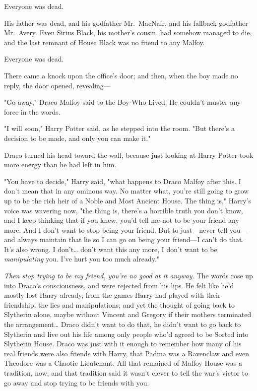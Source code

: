 Everyone was dead.

His father was dead, and his godfather Mr.~MacNair, and his fallback godfather
Mr.~Avery. Even Sirius Black, his mother's cousin, had somehow managed to die,
and the last remnant of House Black was no friend to any Malfoy.

Everyone was dead.

There came a knock upon the office's door; and then, when the boy made no
reply, the door opened, revealing---

"Go away," Draco Malfoy said to the Boy-Who-Lived. He couldn't muster any force
in the words.

"I will soon," Harry Potter said, as he stepped into the room. "But there's a
decision to be made, and only you can make it."

Draco turned his head toward the wall, because just looking at Harry Potter
took more energy than he had left in him.

"You have to decide," Harry said, "what happens to Draco Malfoy after this. I
don't mean that in any ominous way. No matter what, you're still going to grow
up to be the rich heir of a Noble and Most Ancient House. The thing is,"
Harry's voice was wavering now, "the thing is, there's a horrible truth you
don't know, and I keep thinking that if you knew, you'd tell me not to be your
friend any more. And I don't want to stop being your friend. But to just---never
tell you---and always maintain that lie so I can go on being your friend---I
can't do that. It's also wrong. I don't{\ldots} don't want this any more, I
don't want to be \emph{manipulating} you. I've hurt you too much already."

\emph{Then stop trying to be my friend, you're no good at it anyway.} The words
rose up into Draco's consciousness, and were rejected from his lips. He felt
like he'd mostly lost Harry already, from the games Harry had played with their
friendship, the lies and manipulations; and yet the thought of going back to
Slytherin alone, maybe without Vincent and Gregory if their mothers terminated
the arrangement{\ldots} Draco didn't want to do that, he didn't want to go back
to Slytherin and live out his life among only people who'd agreed to be Sorted
into Slytherin House. Draco was just with it enough to remember how many of
his real friends were also friends with Harry, that Padma was a Ravenclaw and
even Theodore was a Chaotic Lieutenant. All that remained of Malfoy House was a
tradition, now; and that tradition said it wasn't clever to tell the war's
victor to go away and stop trying to be friends with you.

